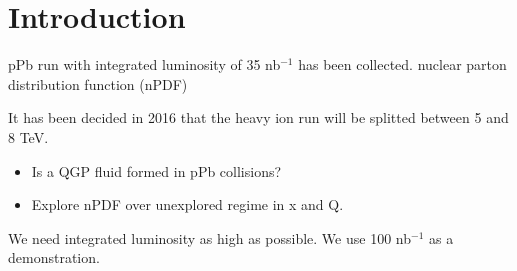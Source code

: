 \section*{Introduction}

pPb run with integrated luminosity of 35 nb$^{-1}$ has been collected.
nuclear parton distribution function (nPDF)

It has been decided in 2016 that the heavy ion run will be splitted between 5 and 8 TeV.

\begin{itemize}
\item Is a QGP fluid formed in pPb collisions?
\item Explore nPDF over unexplored regime in x and Q.
\end{itemize}

We need integrated luminosity as high as possible. 
We use 100 nb$^{-1}$ as a demonstration.